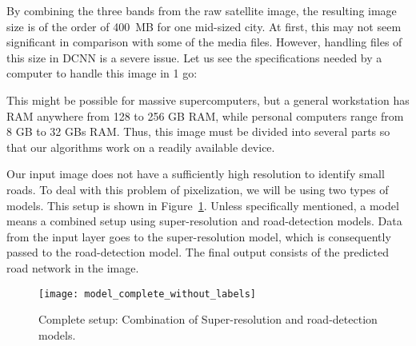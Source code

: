 By combining the three bands from the raw satellite image, the resulting image size is of the order of 400~MB for one mid-sized city. At first, this may not seem significant in comparison with some of the media files. However, handling files of this size in DCNN is a severe issue. Let us see the specifications needed by a computer to handle this image in 1 go:

This might be possible for massive supercomputers, but a general workstation has RAM anywhere from 128 to 256 GB RAM, while personal computers range from 8 GB to 32 GBs RAM. Thus, this image must be divided into several parts so that our algorithms work on a readily available device.

Our input image does not have a sufficiently high resolution to identify small roads. To deal with this problem of pixelization, we will be using two types of models. This setup is shown in Figure~\ref{fig:model_complete_without_labels}. Unless specifically mentioned, a model means a combined setup using super-resolution and road-detection models. Data from the input layer goes to the super-resolution model, which is consequently passed to the road-detection model. The final output consists of the predicted road network in the image.

\begin{figure}
  \centering
  \texttt{[image: model\_complete\_without\_labels]}
  \caption{Complete setup: Combination of Super-resolution and road-detection models.}
  \label{fig:model_complete_without_labels}
\end{figure}
